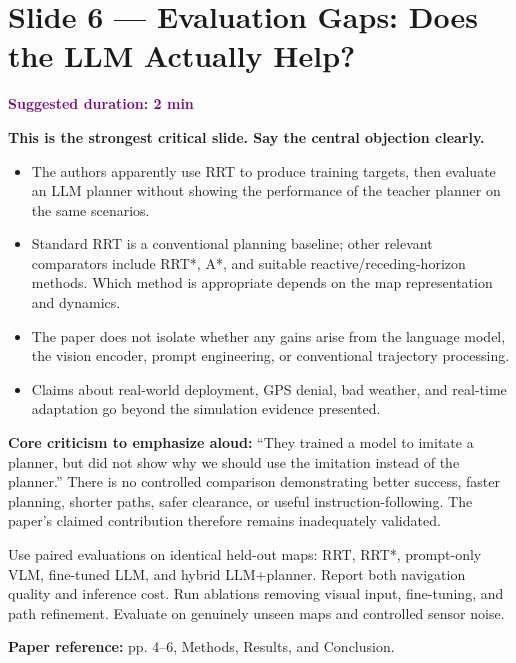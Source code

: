 \documentclass[11pt,a4paper]{article}
\newcommand{\slide}[3]{\clearpage\section*{Slide #1 --- #2}\textcolor{purple}{\textbf{Suggested duration: #3}}\par\medskip}
\newcommand{\source}[1]{\par\small\textcolor{deep}{\textbf{Paper reference:} #1}\normalsize}
\begin{document}
\slide{6}{Evaluation Gaps: Does the LLM Actually Help?}{2 min}
\textbf{This is the strongest critical slide. Say the central objection clearly.}
\begin{itemize}
\item The authors apparently use RRT to produce training targets, then evaluate an LLM planner without showing the performance of the teacher planner on the same scenarios.
\item Standard RRT is a conventional planning baseline; other relevant comparators include RRT*, A*, and suitable reactive/receding-horizon methods. Which method is appropriate depends on the map representation and dynamics.
\item The paper does not isolate whether any gains arise from the language model, the vision encoder, prompt engineering, or conventional trajectory processing.
\item Claims about real-world deployment, GPS denial, bad weather, and real-time adaptation go beyond the simulation evidence presented.
\end{itemize}
\begin{critique}
\textbf{Core criticism to emphasize aloud:} ``They trained a model to imitate a planner, but did not show why we should use the imitation instead of the planner.'' There is no controlled comparison demonstrating better success, faster planning, shorter paths, safer clearance, or useful instruction-following. The paper's claimed contribution therefore remains inadequately validated.
\end{critique}
\begin{repair}
Use paired evaluations on identical held-out maps: RRT, RRT*, prompt-only VLM, fine-tuned LLM, and hybrid LLM+planner. Report both navigation quality and inference cost. Run ablations removing visual input, fine-tuning, and path refinement. Evaluate on genuinely unseen maps and controlled sensor noise.
\end{repair}
\source{pp. 4--6, Methods, Results, and Conclusion.}
\end{document}
